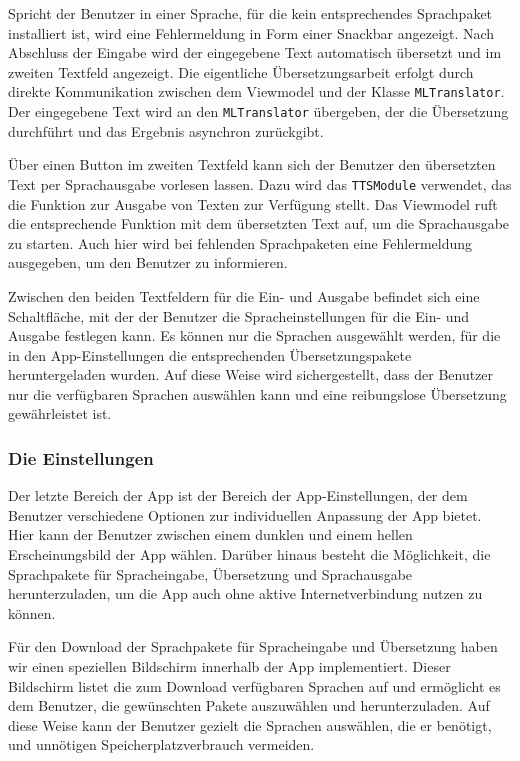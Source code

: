 Spricht der Benutzer in einer Sprache, für die kein entsprechendes Sprachpaket installiert ist, wird eine Fehlermeldung in Form einer Snackbar angezeigt. Nach Abschluss der Eingabe wird der eingegebene Text automatisch übersetzt und im zweiten Textfeld angezeigt. Die eigentliche Übersetzungsarbeit erfolgt durch direkte Kommunikation zwischen dem Viewmodel und der Klasse \texttt{MLTranslator}. Der eingegebene Text wird an den \texttt{MLTranslator} übergeben, der die Übersetzung durchführt und das Ergebnis asynchron zurückgibt.

Über einen Button im zweiten Textfeld kann sich der Benutzer den übersetzten Text per Sprachausgabe vorlesen lassen. Dazu wird das \texttt{TTSModule} verwendet, das die Funktion zur Ausgabe von Texten zur Verfügung stellt. Das Viewmodel ruft die entsprechende Funktion mit dem übersetzten Text auf, um die Sprachausgabe zu starten. Auch hier wird bei fehlenden Sprachpaketen eine Fehlermeldung ausgegeben, um den Benutzer zu informieren.

Zwischen den beiden Textfeldern für die Ein- und Ausgabe befindet sich eine Schaltfläche, mit der der Benutzer die Spracheinstellungen für die Ein- und Ausgabe festlegen kann. Es können nur die Sprachen ausgewählt werden, für die in den App-Einstellungen die entsprechenden Übersetzungspakete heruntergeladen wurden. Auf diese Weise wird sichergestellt, dass der Benutzer nur die verfügbaren Sprachen auswählen kann und eine reibungslose Übersetzung gewährleistet ist.

\subsubsection{Die Einstellungen}
Der letzte Bereich der App ist der Bereich der App-Einstellungen, der dem Benutzer verschiedene Optionen zur individuellen Anpassung der App bietet. Hier kann der Benutzer zwischen einem dunklen und einem hellen Erscheinungsbild der App wählen. Darüber hinaus besteht die Möglichkeit, die Sprachpakete für Spracheingabe, Übersetzung und Sprachausgabe herunterzuladen, um die App auch ohne aktive Internetverbindung nutzen zu können.

Für den Download der Sprachpakete für Spracheingabe und Übersetzung haben wir einen speziellen Bildschirm innerhalb der App implementiert. Dieser Bildschirm listet die zum Download verfügbaren Sprachen auf und ermöglicht es dem Benutzer, die gewünschten Pakete auszuwählen und herunterzuladen. Auf diese Weise kann der Benutzer gezielt die Sprachen auswählen, die er benötigt, und unnötigen Speicherplatzverbrauch vermeiden.


